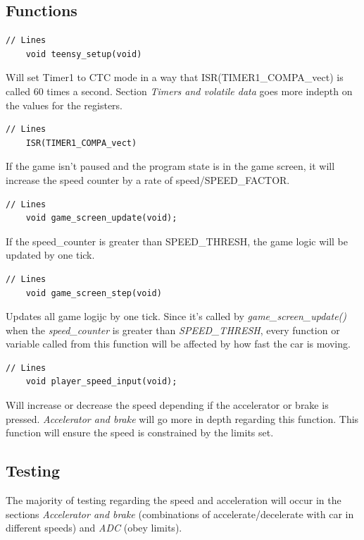 \documentclass{article}
\begin{document}
\subsection*{Functions}
\begin{lstlisting}[style=CStyle]
	// Lines
	void teensy_setup(void)
\end{lstlisting}
Will set Timer1 to CTC mode in a way that ISR(TIMER1\_COMPA\_vect) is called 60 times a second. Section \emph{Timers and volatile data} goes more indepth on the values for the registers. 
\begin{lstlisting}[style=CStyle]
	// Lines
	ISR(TIMER1_COMPA_vect)
\end{lstlisting}
If the game isn't paused and the program state is in the game screen, it will increase the speed counter by a rate of speed/SPEED\_FACTOR.
\begin{lstlisting}[style=CStyle]
	// Lines
	void game_screen_update(void);
\end{lstlisting}
If the speed\_counter is greater than SPEED\_THRESH, the game logic will be updated by one tick. 
\newpage
\begin{lstlisting}[style=CStyle]
	// Lines
	void game_screen_step(void)
\end{lstlisting}
Updates all game logijc by one tick. Since it's called by \emph{game\_screen\_update()} when the \emph{speed\_counter} is greater than \emph{SPEED\_THRESH}, every function or variable called from this function will be affected by how fast the car is moving.
\begin{lstlisting}[style=CStyle]
	// Lines
	void player_speed_input(void);
\end{lstlisting}
Will increase or decrease the speed depending if the accelerator or brake is pressed. \emph{Accelerator and brake} will go more in depth regarding this function. This function will ensure the speed is constrained by the limits set.
\newline

\subsection*{Testing}
The majority of testing regarding the speed and acceleration will occur in the sections \emph{Accelerator and brake} (combinations of accelerate/decelerate with car in different speeds) and \emph{ADC} (obey limits). 
\end{document}
